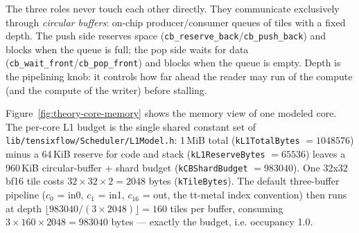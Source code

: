 The three roles never touch each other directly. They communicate exclusively
through \emph{circular buffers}: on-chip producer/consumer queues of tiles with a
fixed depth. The push side reserves space
(\texttt{cb\_reserve\_back}/\texttt{cb\_push\_back}) and blocks when the queue is
full; the pop side waits for data
(\texttt{cb\_wait\_front}/\texttt{cb\_pop\_front}) and blocks when the queue is
empty. Depth is the pipelining knob: it controls how far ahead the reader may run
of the compute (and the compute of the writer) before stalling.

Figure~\ref{fig:theory-core-memory} shows the memory view of one modeled core. The
per-core L1 budget is the single shared constant set of
\texttt{lib/tensixflow/Scheduler/L1Model.h}: 1\,MiB total
(\texttt{kL1TotalBytes} $= 1048576$) minus a 64\,KiB reserve for code and stack
(\texttt{kL1ReserveBytes} $= 65536$) leaves a 960\,KiB circular-buffer + shard
budget (\texttt{kCBShardBudget} $= 983040$). One 32x32 bf16 tile costs
$32 \times 32 \times 2 = 2048$ bytes (\texttt{kTileBytes}). The default
three-buffer pipeline ($c_0$ = in0, $c_1$ = in1, $c_{16}$ = out, the tt-metal
index convention) then runs at depth
$\lfloor 983040 / (3 \times 2048) \rfloor = 160$ tiles per buffer, consuming
$3 \times 160 \times 2048 = 983040$ bytes --- exactly the budget, i.e. occupancy
1.0.

